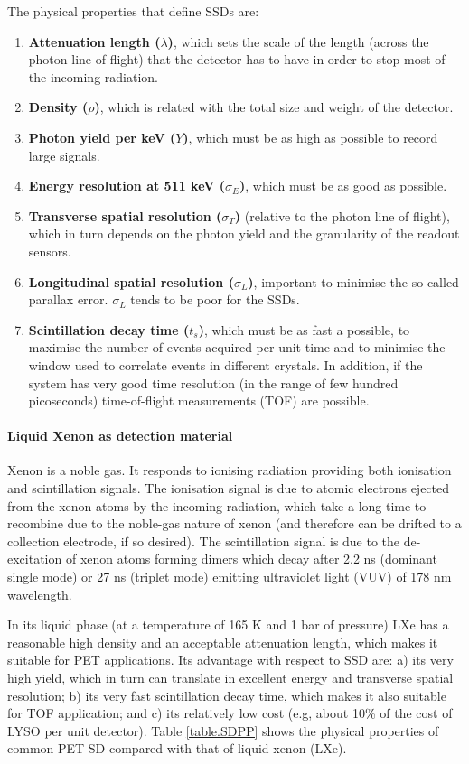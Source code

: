 The physical properties that define SSDs are: 
\begin{enumerate}
\item {\bf Attenuation length ($\lambda$)}, which sets the scale of the length (across the photon line of flight) that the detector has to have in order to stop most of the incoming radiation.
\item {\bf Density ($\rho$)}, which is related with the total size and weight of the detector.
\item {\bf Photon yield per keV ($Y$)}, which must be as high as possible to record large signals. 
\item {\bf Energy resolution at 511 keV ($\sigma_E$)}, which must be as good as possible. 
\item {\bf Transverse spatial resolution ($\sigma_T$)} (relative to the photon line of flight), which in turn depends on the photon yield and the granularity of the readout sensors.
\item {\bf Longitudinal spatial resolution ($\sigma_L$)}, important to minimise the so-called parallax error.  $\sigma_L$  tends to be poor for the SSDs. 
\item {\bf Scintillation decay time ($t_s$)}, which must be as fast a possible, to maximise the number of events acquired per unit time and to minimise the window used to correlate events in different crystals. In addition, if the system has very good time resolution (in the range of few hundred picoseconds) time-of-flight measurements (TOF) are possible.  
\end{enumerate}

\paragraph{Liquid Xenon as detection material}

Xenon is a noble gas. It responds to ionising radiation providing both ionisation and scintillation signals. The ionisation signal is due to atomic electrons ejected from the xenon atoms by the incoming radiation, which take a long time to recombine due to the noble-gas nature of xenon (and therefore can be drifted to a collection electrode, if so desired). The scintillation signal is due to the de-excitation of xenon atoms forming dimers which decay after 2.2 ns (dominant single mode) or 27 ns (triplet mode) emitting ultraviolet light (VUV) of 178 nm wavelength.

In its liquid phase (at a temperature of 165 K and 1 bar of pressure) LXe has a reasonable high density and an acceptable attenuation length, which makes it suitable for PET applications. Its advantage with respect to SSD are: a) its very high yield, which in turn can translate in excellent energy and transverse spatial resolution; b) its very fast scintillation decay time, which makes it also suitable for TOF application;  and c) its relatively low cost (e.g, about 10\% of the cost of LYSO per unit detector).  Table \ref{table.SDPP} shows the physical properties of common PET SD compared with that of liquid xenon (LXe). 


